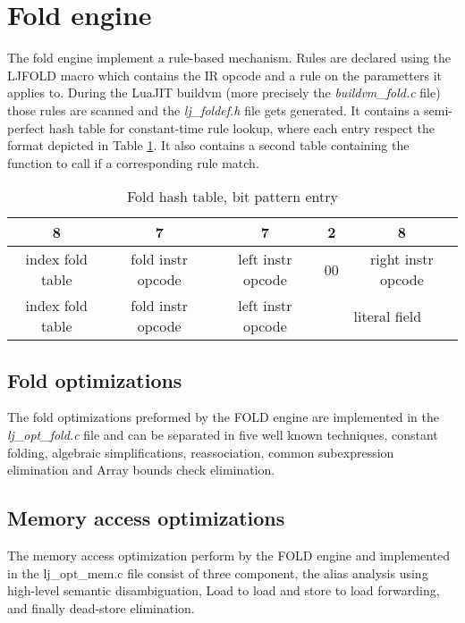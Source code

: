 
\section{Fold engine}
\label{Sec:fold}

The fold engine implement a rule-based mechanism. Rules are declared using the
LJFOLD macro which contains the IR opcode and a rule on the parametters it
applies to. During the LuaJIT buildvm (more precisely the \emph{buildvm\_fold.c}
file) those rules are scanned and the \emph{lj\_foldef.h} file gets generated.
It contains a semi-perfect hash table for constant-time rule lookup, where each
entry respect the format depicted in Table \ref{tab:fold-format}. It also
contains a second table containing the function to call if a corresponding rule
match.

\begin{table}[H]
\centering
\caption{Fold hash table, bit pattern entry}
\label{tab:fold-format}
\begin{tabular}{|c|c|c|c|c|}
\hline
8                & 7                 & 7                 & 2        & 8                       \\ \hline
index fold table & fold instr opcode & left instr opcode & 00       & right instr opcode      \\ \hline
index fold table & fold instr opcode & left instr opcode & \multicolumn{2}{c|}{literal field} \\ \hline
\end{tabular}
\end{table}

\subsection{Fold optimizations}
\label{Subsec:fold}

The fold optimizations preformed by the FOLD engine are implemented in the
\emph{lj\_opt\_fold.c} file and can be separated in five well known techniques,
constant folding, algebraic simplifications, reassociation, common subexpression
elimination and Array bounds check elimination.

\subsection{Memory access optimizations}
\label{Subsec:mao}

The memory access optimization perform by the FOLD engine and implemented
in the lj\_opt\_mem.c file consist of three component, the alias
analysis using high-level semantic disambiguation, Load to load and store to load
forwarding, and finally dead-store elimination.
